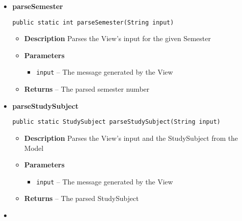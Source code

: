 \documentclass[11pt,a4paper]{report}
\begin{document}
{{{{{{{{\begin{itemize}
{\begin{itemize}
{							}%
						\end{itemize}
					}%
					\item{ 
						\hypertarget{studyplanning.controller.InputParser.parseSemester(java.lang.String)}{{\bf  parseSemester}\\}
						\begin{lstlisting}[frame=none]
public static int parseSemester(String input)
						\end{lstlisting} %
						\begin{itemize}
							\item{
								{\bf  Description}
								Parses the View's input for the given Semester
							}
							\item{
								{\bf  Parameters}
								\begin{itemize}
									\item{\texttt{input} -- The message generated by the View}
								\end{itemize}
							}%
							\item{{\bf  Returns} 
								-- The parsed semester number 
							}%
						\end{itemize}
					}%
					\item{ 
						\hypertarget{studyplanning.controller.InputParser.parseStudySubject(java.lang.String)}{{\bf  parseStudySubject}\\}
						\begin{lstlisting}[frame=none]
public static StudySubject parseStudySubject(String input)
						\end{lstlisting} %
						\begin{itemize}
							\item{
								{\bf  Description}
								Parses the View's input and the StudySubject from the Model
							}
							\item{
								{\bf  Parameters}
								\begin{itemize}
									\item{\texttt{input} -- The message generated by the View}
								\end{itemize}
							}%
							\item{{\bf  Returns}
								-- The parsed StudySubject
							}%
						\end{itemize}
					}%
					\item{ 
}
\end{itemize}}}}}}}}}
\end{document}
